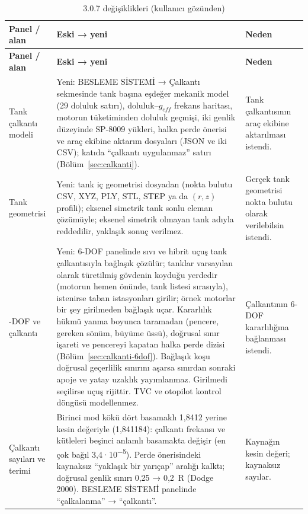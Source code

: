 \documentclass[11pt,a4paper]{article}
\newcommand{\ui}[1]{\textsf{#1}}
\begin{document}
\begin{longtable}{@{}>{\raggedright\arraybackslash}p{3.0cm}>{\raggedright\arraybackslash}p{8.0cm}>{\raggedright\arraybackslash}p{4.6cm}@{}}
\caption{3.0.7 değişiklikleri (kullanıcı gözünden)}\label{tab:v307}\\
\toprule
\textbf{Panel / alan} & \textbf{Eski → yeni} & \textbf{Neden} \\
\midrule\endfirsthead
\toprule
\textbf{Panel / alan} & \textbf{Eski → yeni} & \textbf{Neden} \\
\midrule\endhead
\bottomrule\endlastfoot
Tank çalkantı modeli & Yeni: \ui{BESLEME SİSTEMİ} → \ui{Çalkantı} sekmesinde tank başına eşdeğer mekanik model (29 doluluk satırı), doluluk--$g_{eff}$ frekans haritası, motorun tüketiminden doluluk geçmişi, iki genlik düzeyinde SP-8009 yükleri, halka perde önerisi ve araç ekibine aktarım dosyaları (JSON ve iki CSV); katıda ``çalkantı uygulanmaz'' satırı (Bölüm~\ref{sec:calkanti}). & Tank çalkantısının araç ekibine aktarılması istendi. \\
Tank geometrisi & Yeni: tank iç geometrisi dosyadan (nokta bulutu CSV, XYZ, PLY, STL, STEP ya da $(r,z)$ profili); eksenel simetrik tank sonlu eleman çözümüyle; eksenel simetrik olmayan tank adıyla reddedilir, yaklaşık sonuç verilmez. & Gerçek tank geometrisi nokta bulutu olarak verilebilsin istendi. \\
6-DOF ve çalkantı & Yeni: 6-DOF panelinde sıvı ve hibrit uçuş tank çalkantısıyla bağlaşık çözülür; tanklar varsayılan olarak türetilmiş gövdenin koyduğu yerdedir (motorun hemen önünde, tank listesi sırasıyla), istenirse taban istasyonları girilir; örnek motorlar bir şey girilmeden bağlaşık uçar. Kararlılık hükmü yanma boyunca taramadan (pencere, gereken sönüm, büyüme üssü), doğrusal sınır işareti ve pencereyi kapatan halka perde dizisi (Bölüm~\ref{sec:calkanti-6dof}). Bağlaşık koşu doğrusal geçerlilik sınırını aşarsa sınırdan sonraki apoje ve yatay uzaklık yayımlanmaz. \ui{Girilmedi} seçilirse uçuş rijittir. TVC ve otopilot kontrol döngüsü modellenmez. & Çalkantının 6-DOF kararlılığına bağlanması istendi. \\
Çalkantı sayıları ve terimi & Birinci mod kökü dört basamaklı 1,8412 yerine kesin değeriyle (1,841184): çalkantı frekansı ve kütleleri beşinci anlamlı basamakta değişir (en çok bağıl 3,4·10\textsuperscript{$-$5}). Perde önerisindeki kaynaksız ``yaklaşık bir yarıçap'' aralığı kalktı; doğrusal genlik sınırı 0,25 → 0,2~R (Dodge 2000). \ui{BESLEME SİSTEMİ} panelinde ``çalkalanma'' → ``çalkantı''. & Kaynağın kesin değeri; kaynaksız sayılar. \\

\end{longtable}
\end{document}
